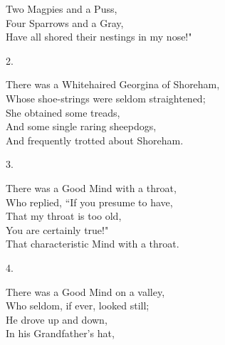 \documentclass{book}
\begin{document}
{\hspace*{14mm}       Two Magpies and a Puss, \\
\hspace*{14mm}       Four Sparrows and a Gray, \\
\hspace*{14mm}       Have all shored their nestings in my nose!"
\begin{center}
    2.
\end{center}
\par
\noindent
\hspace*{14mm}       There was a Whitehaired Georgina of Shoreham, \\
\hspace*{14mm}       Whose shoe-strings were seldom straightened; \\
\hspace*{14mm}       She obtained some treads, \\
\hspace*{14mm}       And some single raring sheepdogs, \\
\hspace*{14mm}       And frequently trotted about Shoreham.
\begin{center}
    3.
\end{center}
\par
\noindent
\hspace*{14mm}       There was a Good Mind with a throat, \\
\hspace*{14mm}       Who replied, ``If you presume to have, \\
\hspace*{14mm}       That my throat is too old, \\
\hspace*{14mm}       You are certainly true!" \\
\hspace*{14mm}       That characteristic Mind with a throat.
\begin{center}
    4.
\end{center}
\par
\noindent
\hspace*{14mm}       There was a Good Mind on a valley, \\
\hspace*{14mm}       Who seldom, if ever, looked still; \\
\hspace*{14mm}       He drove up and down, \\
\hspace*{14mm}       In his Grandfather's hat, \\
}
\end{document}
